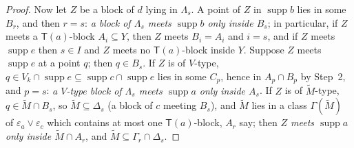 \documentclass[11pt]{amsart}
\theoremstyle{definition}
\newcommand{\supp}{\operatorname{supp}}
\newcommand{\T}{\mathsf{T}}
\begin{document}
\begin{proof}
Now let $Z$ be a block of $d$ lying in $\Lambda_s$. A point of $Z$ in $\supp b$ lies in some $B_r$, and then $r=s$: \emph{a block of $\Lambda_s$ meets $\supp b$ only inside $B_s$}; in particular, if $Z$ meets a $\T(a)$-block $A_i\subseteq Y$, then $Z$ meets $B_i=A_i$ and $i=s$, and if $Z$ meets $\supp e$ then $s\in I$ and $Z$ meets no $\T(a)$-block inside $Y$. Suppose $Z$ meets $\supp e$ at a point $q$; then $q\in B_s$. If $Z$ is of $V$-type, $q\in V_k\cap\supp e\subseteq\supp c\cap\supp e$ lies in some $C_p$, hence in $A_p\cap B_p$ by Step~2, and $p=s$: \emph{a $V$-type block of $\Lambda_s$ meets $\supp a$ only inside $A_s$}. If $Z$ is of $\tilde M$-type, $q\in\tilde M\cap B_s$, so $\tilde M\subseteq\Delta_s$ (a block of $c$ meeting $B_s$), and $\tilde M$ lies in a class $\Gamma(\tilde M)$ of $\varepsilon_a\vee\varepsilon_c$ which contains at most one $\T(a)$-block, $A_r$ say; then \emph{$Z$ meets $\supp a$ only inside $\tilde M\cap A_r$}, and $\tilde M\subseteq\Gamma_r\cap\Delta_s$.


\end{proof}
\end{document}
